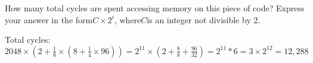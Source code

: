 \begin{blocksection}
\question
How many total cycles are spent accessing memory on this piece of code? Express your answer in the form ​$C \times 2^{i}$​ ​, where ​$C$​ is an integer not divisible by $2$.

\begin{solution}[0.7in]
Total cycles: ​$2048 \times (2 + \frac{1}{8} \times (8 + \frac{1}{4} \times 96)) = 2^{11} \times (2 + \frac{8}{8} + \frac{96}{32}) = 2^{11} * 6 = 3 \times 2^{12} = 12,288$
\end{solution}
\end{blocksection}